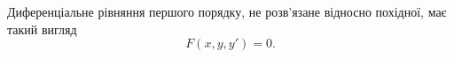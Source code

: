 Диференціальне рівняння першого порядку, не розв'язане відносно похідної, має такий вигляд
\begin{equation*}
	F(x, y, y') = 0. 	
\end{equation*}
